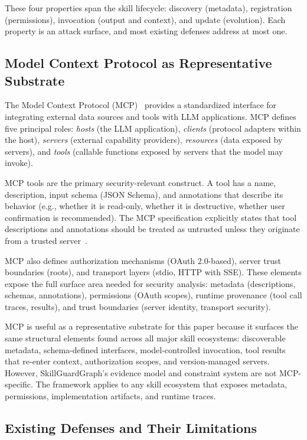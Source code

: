 These four properties span the skill lifecycle: discovery (metadata), registration (permissions), invocation (output and context), and update (evolution). Each property is an attack surface, and most existing defenses address at most one.

\subsection{Model Context Protocol as Representative Substrate}
\label{sec:mcp}

The Model Context Protocol (MCP)~\cite{mcp_spec_2025} provides a standardized interface for integrating external data sources and tools with LLM applications. MCP defines five principal roles: \emph{hosts} (the LLM application), \emph{clients} (protocol adapters within the host), \emph{servers} (external capability providers), \emph{resources} (data exposed by servers), and \emph{tools} (callable functions exposed by servers that the model may invoke).

MCP tools are the primary security-relevant construct. A tool has a name, description, input schema (JSON Schema), and annotations that describe its behavior (e.g., whether it is read-only, whether it is destructive, whether user confirmation is recommended). The MCP specification explicitly states that tool descriptions and annotations should be treated as untrusted unless they originate from a trusted server~\cite{mcp_tools_2025}.

MCP also defines authorization mechanisms (OAuth 2.0-based), server trust boundaries (roots), and transport layers (stdio, HTTP with SSE). These elements expose the full surface area needed for security analysis: metadata (descriptions, schemas, annotations), permissions (OAuth scopes), runtime provenance (tool call traces, results), and trust boundaries (server identity, transport security).

MCP is useful as a representative substrate for this paper because it surfaces the same structural elements found across all major skill ecosystems: discoverable metadata, schema-defined interfaces, model-controlled invocation, tool results that re-enter context, authorization scopes, and version-managed servers. However, SkillGuardGraph's evidence model and constraint system are not MCP-specific. The framework applies to any skill ecosystem that exposes metadata, permissions, implementation artifacts, and runtime traces.

\subsection{Existing Defenses and Their Limitations}
\label{sec:existing_defenses}

